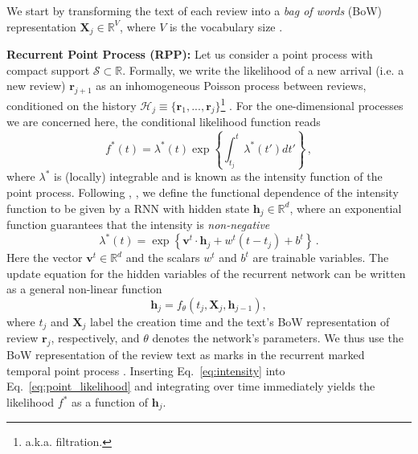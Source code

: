 \documentclass[letterpaper]{article} %
\newcommand{\+}[1]{\boldsymbol{\mathbf{#1}}}
\newcommand*{\Eqref}[1]{Eq.~\eqref{#1}}
\def\*#1{\mathbf{#1}}
\begin{document}
We start by transforming the text of each review into a \textit{bag of words} (BoW) representation $\mathbf{X}_j\in \mathbb{R}^V$, where $V$ is the vocabulary size \cite{NIPS2009_3856}.

\textbf{Recurrent Point Process (RPP):}
\label{ssec:RMPP}
Let us consider a point process with compact support $\mathcal{S} \subset \mathbb{R}$. Formally, we write the likelihood of a new arrival (i.e. a new review) $\*r_{j+1}$ as an inhomogeneous Poisson process between reviews, conditioned on the history $\mathcal{H}_j \equiv  \{\*r_1,...,\*r_j\}$\footnote{a.k.a. filtration.} \cite{VereJones}.
For the one-dimensional processes we are concerned here, the conditional likelihood function reads
\begin{equation}
f^*(t) = \lambda^*(t) \exp\left\{ \int^{t}_{t_j}\lambda^*\left(t'\right)dt' \right\}\, ,
\label{eq:point_likelihood}
\end{equation}
where $\lambda^*$ is (locally) integrable and is known as the intensity function of the point process.
Following \cite{NeuralHawkes}, \cite{RecurrentTemporal}, we define the functional dependence of the intensity function to be given by a RNN with hidden state $\*h_j \in \mathbb{R}^d$, where an exponential function guarantees that the intensity is \textit{non-negative}
\begin{equation}
\lambda^*(t) = \exp{\left\{\*v^t\cdot\*h_j + w^t\left(t-t_j\right) + b^t\right\}} \label{eq:intensity}\, .
\end{equation}
Here the vector $\*v^t \in \mathbb{R}^d$ and the scalars $w^t$ and $b^t$ are trainable variables. The update equation for the hidden variables of the recurrent network can be written as a general non-linear function
\begin{equation}
\*h_j = f_{\theta}(t_{j}, \*X_j, \*h_{j-1}),
\label{eq:transitionfunction}
\end{equation}
where $t_j$ and $\*X_j$ label the creation time and the text's BoW representation of review $\*r_j$, respectively, and $\theta$ denotes the network's parameters. We thus use the BoW representation of the review text as marks in the recurrent marked temporal point process \cite{du2016recurrent}. Inserting \Eqref{eq:intensity} into \Eqref{eq:point_likelihood} and integrating over time immediately yields the likelihood $f^*$ as a function of $\*h_j$.
\end{document}
